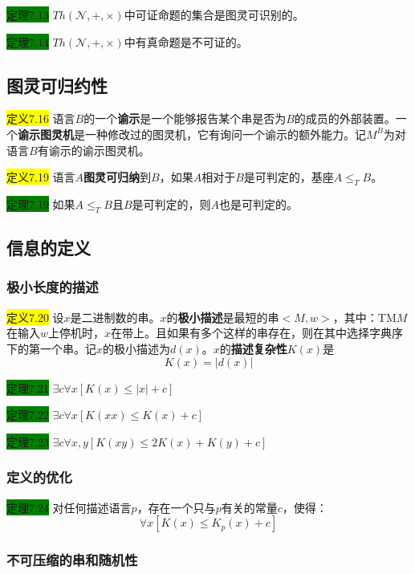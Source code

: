 \documentclass[a4paper]{article}
\begin{document}
	\colorbox{green}{定理7.13} $Th(\mathcal{N},+, \times)$中可证命题的集合是图灵可识别的。
	
	\colorbox{green}{定理7.14} $Th(\mathcal{N},+, \times)$中有真命题是不可证的。

\subsection{图灵可归约性}

	\colorbox{yellow}{定义7.16} 语言$B$的一个\textbf{谕示}是一个能够报告某个串是否为$B$的成员的外部装置。一个\textbf{谕示图灵机}是一种修改过的图灵机，它有询问一个谕示的额外能力。记$M^B$为对语言$B$有谕示的谕示图灵机。
	
	\colorbox{yellow}{定义7.19} 语言$A$\textbf{图灵可归纳}到$B$，如果$A$相对于$B$是可判定的，基座$A \leq_T B$。
		
	\colorbox{green}{定理7.19} 如果$A \leq_T B$且$B$是可判定的，则$A$也是可判定的。

\subsection{信息的定义}

\subsubsection{极小长度的描述}

	\colorbox{yellow}{定义7.20} 设$x$是二进制数的串。$x$的\textbf{极小描述}是最短的串$<M,w>$，其中：TM$M$在输入$w$上停机时，$x$在带上。且如果有多个这样的串存在，则在其中选择字典序下的第一个串。记$x$的极小描述为$d(x)$。$x$的\textbf{描述复杂性}$K(x)$是
	$$K(x)=|d(x)|$$

	\colorbox{green}{定理7.21} $\exists c \forall x [K(x) \leq |x| + c]$
	
	\colorbox{green}{定理7.22} $\exists c \forall x [K(xx) \leq K(x) + c]$
	
	\colorbox{green}{定理7.23} $\exists c \forall x, y [K(xy) \leq 2K(x) + K(y) + c]$

\subsubsection{定义的优化}

	\colorbox{green}{定理7.24} 对任何描述语言$p$，存在一个只与$p$有关的常量$c$，使得：
	$$\forall x[K(x) \leq K_p(x)+c]$$

\subsubsection{不可压缩的串和随机性}
\end{document}
